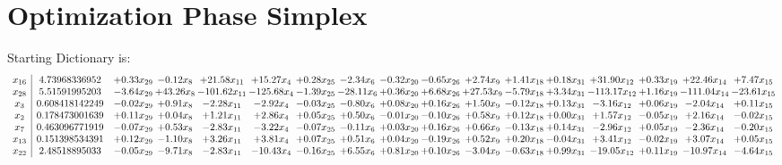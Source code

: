 \documentclass[9pt]{article}
\begin{document}
\section{Optimization Phase Simplex}
Starting Dictionary is:
\[\begin{array}{c| c c@{\hskip 2pt} c@{\hskip 2pt} c@{\hskip 2pt} c@{\hskip 2pt} c@{\hskip 2pt} c@{\hskip 2pt} c@{\hskip 2pt} c@{\hskip 2pt} c@{\hskip 2pt} c@{\hskip 2pt} c@{\hskip 2pt} c@{\hskip 2pt} c@{\hskip 2pt} c@{\hskip 2pt} c@{\hskip 2pt} }
 x_{16}   &  4.73968336952 & +  0.33 x_{29} & -0.12 x_{8} & + 21.58 x_{11} & + 15.27 x_{4} & +  0.28 x_{25} & -2.34 x_{6} & -0.32 x_{20} & -0.65 x_{26} & +  2.74 x_{9} & +  1.41 x_{18} & +  0.18 x_{31} & + 31.90 x_{12} & +  0.33 x_{19} & + 22.46 x_{14} & +  7.47 x_{15}\\
 x_{28}   &  5.51591995203 & -3.64 x_{29} & + 43.26 x_{8} & -101.62 x_{11} & -125.68 x_{4} & -1.39 x_{25} & -28.11 x_{6} & +  0.36 x_{20} & +  6.68 x_{26} & + 27.53 x_{9} & -5.79 x_{18} & +  3.34 x_{31} & -113.17 x_{12} & +  1.16 x_{19} & -111.04 x_{14} & -23.61 x_{15}\\
 x_{3}   &  0.608418142249 & -0.02 x_{29} & +  0.91 x_{8} & -2.28 x_{11} & -2.92 x_{4} & -0.03 x_{25} & -0.80 x_{6} & +  0.08 x_{20} & +  0.16 x_{26} & +  1.50 x_{9} & -0.12 x_{18} & +  0.13 x_{31} & -3.16 x_{12} & +  0.06 x_{19} & -2.04 x_{14} & +  0.11 x_{15}\\
 x_{2}   &  0.178473001639 & +  0.11 x_{29} & +  0.04 x_{8} & +  1.21 x_{11} & +  2.86 x_{4} & +  0.05 x_{25} & +  0.50 x_{6} & -0.01 x_{20} & -0.10 x_{26} & +  0.58 x_{9} & +  0.12 x_{18} & +  0.00 x_{31} & +  1.57 x_{12} & -0.05 x_{19} & +  2.16 x_{14} & -0.02 x_{15}\\
 x_{7}   &  0.463096771919 & -0.07 x_{29} & +  0.53 x_{8} & -2.83 x_{11} & -3.22 x_{4} & -0.07 x_{25} & -0.11 x_{6} & +  0.03 x_{20} & +  0.16 x_{26} & +  0.66 x_{9} & -0.13 x_{18} & +  0.14 x_{31} & -2.96 x_{12} & +  0.05 x_{19} & -2.36 x_{14} & -0.20 x_{15}\\
 x_{13}   &  0.151398534391 & +  0.12 x_{29} & -1.10 x_{8} & +  3.26 x_{11} & +  3.81 x_{4} & +  0.07 x_{25} & +  0.51 x_{6} & +  0.04 x_{20} & -0.19 x_{26} & +  0.52 x_{9} & +  0.20 x_{18} & -0.04 x_{31} & +  3.41 x_{12} & -0.02 x_{19} & +  3.07 x_{14} & +  0.05 x_{15}\\
 x_{22}   &  2.48518895033 & -0.05 x_{29} & -9.71 x_{8} & -2.83 x_{11} & -10.43 x_{4} & -0.16 x_{25} & +  6.55 x_{6} & +  0.81 x_{20} & +  0.10 x_{26} & -3.04 x_{9} & -0.63 x_{18} & +  0.99 x_{31} & -19.05 x_{12} & +  0.11 x_{19} & -10.97 x_{14} & -4.64 x_{15}\\

\end{array}\]
\end{document}
